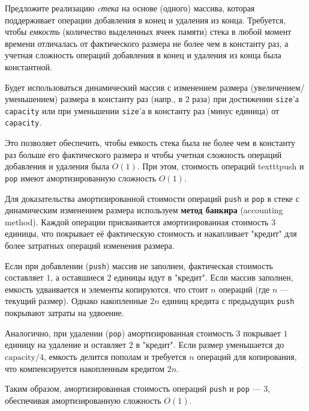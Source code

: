 \documentclass[11pt]{article}
\begin{document}
\begin{problem}{20}
	Предложите реализацию \emph{cтека} на основе (одного) массива, которая поддерживает операции добавления в конец и удаления из конца. Требуется, чтобы \emph{емкость} (количество выделенных ячеек памяти) стека в любой момент времени отличалась от фактического размера не более чем в константу раз, а учетная сложность операций добавления в конец и удаления из конца была константной.
	\end{problem}
	
	\begin{solution}
		Будет использоваться динамический массив с изменением размера (увеличением/уменьшением) размера в константу раз (напр., в 2 раза) при достижении \texttt{size}'а \texttt{capacity} или при уменьшении \texttt{size}'а в константу раз (минус единица) от \texttt{capacity}.
	
		Это позволяет обеспечить, чтобы емкость стека была не более чем в константу раз больше его фактического размера и чтобы учетная сложность операций добавления и удаления была $O(1)$. При этом, стоимость операций texttt{push} и \texttt{pop} имеют амортизированную сложность $O(1)$.
	
		Для доказательства амортизированной стоимости операций \texttt{push} и \texttt{pop} в стеке с динамическим изменением размера используем \textbf{метод банкира} (accounting method). Каждой операции присваивается амортизированная стоимость \(3\) единицы, что покрывает её фактическую стоимость и накапливает "кредит" для более затратных операций изменения размера.
	
		Если при добавлении (\texttt{push}) массив не заполнен, фактическая стоимость составляет \(1\), а оставшиеся \(2\) единицы идут в "кредит". Если массив заполнен, емкость удваивается и элементы копируются, что стоит \(n\) операций (где \(n\) — текущий размер). Однако накопленные \(2n\) единиц кредита с предыдущих \texttt{push} покрывают затраты на удвоение.
	
		Аналогично, при удалении (\texttt{pop}) амортизированная стоимость \(3\) покрывает \(1\) единицу на удаление и оставляет \(2\) в "кредит". Если размер уменьшается до \(\text{capacity}/4\), емкость делится пополам и требуется \(n\) операций для копирования, что компенсируется накопленным кредитом \(2n\).
	
		Таким образом, амортизированная стоимость операций \texttt{push} и \texttt{pop} — \(3\), обеспечивая амортизированную сложность \(O(1)\).
	
	\end{solution}
	
\end{document}
